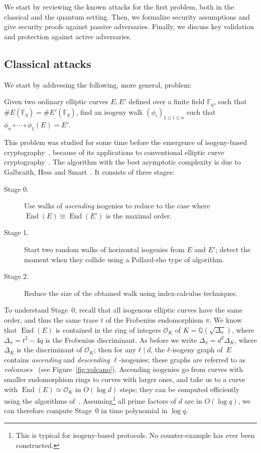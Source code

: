 \documentclass{llncs}
\newcommand{\F}{\mathbb{F}}
\renewcommand{\O}{\mathcal{O}}
\DeclareMathOperator{\End}{End}
\begin{document}
We start by reviewing the known attacks for the first problem, both in
the classical and the quantum setting. Then, we formalize security
assumptions and give security proofs against passive adversaries.
Finally, we discuss key validation and protection against active
adversaries.

\subsection{Classical attacks}
\label{sec:classical-attacks}

We start by addressing the following, more general, problem:

\begin{problem}
\label{prob:isog}
  Given two ordinary elliptic curves $E,E'$ defined over a finite
  field $\F_q$, such that $\#E(\F_q)=\#E'(\F_q)$, find an isogeny walk
  $(ϕ_i)_{1≤i≤n}$ such that $ϕ_n∘\cdots∘ϕ_1(E)=E'$.
\end{problem}

This problem was studied for some time before the emergence of
isogeny-based cryptography~\cite{Gal,GHS,galbraith+stolbunov11},
because of its applications to conventional elliptic curve
cryptography~\cite{GHS,teske06,jao+miller+venkatesan09}.  The
algorithm with the best asymptotic complexity is due to Galbraith,
Hess and Smart~\cite{GHS}. It consists of three stages:
\begin{description}
\item[Stage 0.] Use walks of \emph{ascending} isogenies to reduce to the case where
  $\End(E)\cong\End(E')$ is the maximal order.
\item[Stage 1.] Start two random walks of horizontal isogenies 
  from $E$ and $E'$; detect the
  moment when they collide using a Pollard-rho type of algorithm.
\item[Stage 2.] Reduce the size of the obtained walk using
  index-calculus techniques.
\end{description}

To understand Stage~0, recall that all isogenous elliptic curves have
the same order, and thus the same trace $t$ of the Frobenius
endomorphism $π$. 
We know that
$\End(E)$ is contained in the ring of integers $\O_K$ of
$K=ℚ(\sqrt{Δ_π})$,
where $Δ_π=t^2-4q$ is the Frobenius discriminant.
As before we write $Δ_π=d^2Δ_K$, where $Δ_K$ is the
discriminant
of $\O_K$; then for any $ℓ\mid d$, the
$ℓ$-isogeny graph of~$E$ contains \emph{ascending} and
\emph{descending} $\ell$-isogenies; 
these graphs are referred to as 
\emph{volcanoes}~\cite{fouquet+morain02} (see Figure~\ref{fig:volcano}).
Ascending isogenies go from curves with smaller endomorphism rings to
curves with larger ones, and take us to a curve with $\End(E)≃\O_K$ in
$O(\log d)$ steps; they can be computed efficiently using the
algorithms
of~\cite{kohel,fouquet+morain02,ionica+joux13,defeo2016explicit}.
Assuming\footnote{%
    This is typical for isogeny-based protocols.
    No counter-example has ever been constructed.
}
all prime factors of $d$ are in $O(\log q)$,
we can therefore compute Stage~0
in time polynomial in $\log q$.
\end{document}
